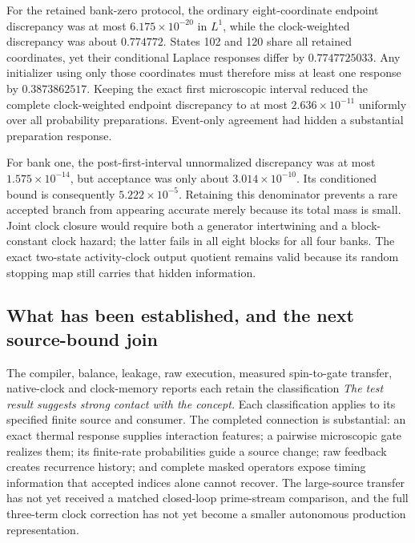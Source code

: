 For the retained bank-zero protocol, the ordinary eight-coordinate endpoint discrepancy was at most $6.175\times10^{-20}$ in $L^1$, while the clock-weighted discrepancy was about $0.774772$. States 102 and 120 share all retained coordinates, yet their conditional Laplace responses differ by $0.7747725033$. Any initializer using only those coordinates must therefore miss at least one response by $0.3873862517$. Keeping the exact first microscopic interval reduced the complete clock-weighted endpoint discrepancy to at most $2.636\times10^{-11}$ uniformly over all probability preparations. Event-only agreement had hidden a substantial preparation response.

For bank one, the post-first-interval unnormalized discrepancy was at most $1.575\times10^{-14}$, but acceptance was only about $3.014\times10^{-10}$. Its conditioned bound is consequently $5.222\times10^{-5}$. Retaining this denominator prevents a rare accepted branch from appearing accurate merely because its total mass is small. Joint clock closure would require both a generator intertwining and a block-constant clock hazard; the latter fails in all eight blocks for all four banks. The exact two-state activity-clock output quotient remains valid because its random stopping map still carries that hidden information.

\subsection{What has been established, and the next source-bound join}

The compiler, balance, leakage, raw execution, measured spin-to-gate transfer, native-clock and clock-memory reports each retain the classification \emph{The test result suggests strong contact with the concept.} Each classification applies to its specified finite source and consumer. The completed connection is substantial: an exact thermal response supplies interaction features; a pairwise microscopic gate realizes them; its finite-rate probabilities guide a source change; raw feedback creates recurrence history; and complete masked operators expose timing information that accepted indices alone cannot recover. The large-source transfer has not yet received a matched closed-loop prime-stream comparison, and the full three-term clock correction has not yet become a smaller autonomous production representation.


